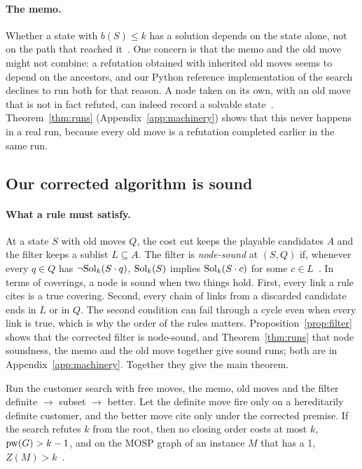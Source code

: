 \paragraph{The memo.} Whether a state with $b(S)\le k$ has a solution depends
on the state alone, not on the path that reached it~. One
concern is that the memo and the old move might not combine: a refutation
obtained with inherited old moves seems to depend on the ancestors, and our Python reference implementation of the search declines to run both for that reason. A node
taken on its own, with an old move that is not in fact refuted, can indeed
record a solvable state~. Theorem~\ref{thm:runs}
(Appendix~\ref{app:machinery}) shows that this never happens in a real run,
because every old move is a refutation completed earlier in the same run.

\subsection{Our corrected algorithm is sound}
\label{sec:theorem}

\paragraph{What a rule must satisfy.} At a state $S$ with old moves $Q$, the
cost cut keeps the playable candidates $A$ and the filter keeps a sublist
$L\subseteq A$. The filter is \emph{node-sound} at $(S,Q)$ if, whenever every
$q\in Q$ has $\neg\mathrm{Sol}_k(S\cdot q)$, $\mathrm{Sol}_k(S)$ implies $\mathrm{Sol}_k(S\cdot c)$ for
some $c\in L$~. In terms of coverings, a node is sound when
two things hold. First, every link a rule cites is a true covering. Second,
every chain of links from a discarded candidate ends in $L$ or in $Q$. The
second condition can fail through a cycle even when every link is true, which
is why the order of the rules matters. Proposition~\ref{prop:filter} shows that
the corrected filter is node-sound, and Theorem~\ref{thm:runs} that node
soundness, the memo and the old move together give sound runs; both are in
Appendix~\ref{app:machinery}. Together they give the main theorem.

\begin{theorem}\label{thm:main}
Run the customer search with free moves, the memo, old moves and the filter
definite $\to$ subset $\to$ better. Let the definite move fire only on a
hereditarily definite customer, and the better move cite only under the
corrected premise. If the search refutes $k$ from the root, then no closing order costs
at most $k$, $\mathrm{pw}(G)>k-1$, and on the MOSP graph of an instance $M$ that has a 1,
$Z(M)>k$~.
\end{theorem}

